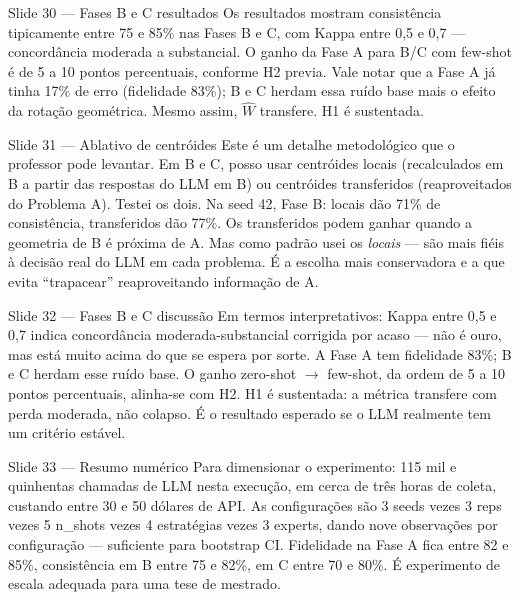 \documentclass[aspectratio=169,10pt]{beamer}
\begin{document}
\begin{frame}{Slide 30 --- Fases B e C resultados}
\footnotesize
Os resultados mostram consist\^encia tipicamente entre 75 e 85\% nas Fases B e C, com Kappa entre 0{,}5 e 0{,}7 --- concord\^ancia moderada a substancial. O ganho da Fase A para B/C com few-shot \'e de 5 a 10 pontos percentuais, conforme H2 previa. Vale notar que a Fase A j\'a tinha 17\% de erro (fidelidade 83\%); B e C herdam essa ru\'ido base mais o efeito da rota\c{c}\~ao geom\'etrica. Mesmo assim, $\hat W$ transfere. H1 \'e sustentada.
\end{frame}

\begin{frame}{Slide 31 --- Ablativo de centr\'oides}
\footnotesize
Este \'e um detalhe metodol\'ogico que o professor pode levantar. Em B e C, posso usar centr\'oides locais (recalculados em B a partir das respostas do LLM em B) ou centr\'oides transferidos (reaproveitados do Problema A). Testei os dois. Na seed 42, Fase B: locais d\~ao 71\% de consist\^encia, transferidos d\~ao 77\%. Os transferidos podem ganhar quando a geometria de B \'e pr\'oxima de A. Mas como padr\~ao usei os \emph{locais} --- s\~ao mais fi\'eis \`a decis\~ao real do LLM em cada problema. \'E a escolha mais conservadora e a que evita ``trapacear'' reaproveitando informa\c{c}\~ao de A.
\end{frame}

\begin{frame}{Slide 32 --- Fases B e C discuss\~ao}
\footnotesize
Em termos interpretativos: Kappa entre 0{,}5 e 0{,}7 indica concord\^ancia moderada-substancial corrigida por acaso --- n\~ao \'e ouro, mas est\'a muito acima do que se espera por sorte. A Fase A tem fidelidade 83\%; B e C herdam esse ru\'ido base. O ganho zero-shot $\to$ few-shot, da ordem de 5 a 10 pontos percentuais, alinha-se com H2. H1 \'e sustentada: a m\'etrica transfere com perda moderada, n\~ao colapso. \'E o resultado esperado se o LLM realmente tem um crit\'erio est\'avel.
\end{frame}

\begin{frame}{Slide 33 --- Resumo num\'erico}
\footnotesize
Para dimensionar o experimento: 115 mil e quinhentas chamadas de LLM nesta execu\c{c}\~ao, em cerca de tr\^es horas de coleta, custando entre 30 e 50 d\'olares de API. As configura\c{c}\~oes s\~ao 3 seeds vezes 3 reps vezes 5 n\_shots vezes 4 estrat\'egias vezes 3 experts, dando nove observa\c{c}\~oes por configura\c{c}\~ao --- suficiente para bootstrap CI. Fidelidade na Fase A fica entre 82 e 85\%, consist\^encia em B entre 75 e 82\%, em C entre 70 e 80\%. \'E experimento de escala adequada para uma tese de mestrado.
\end{frame}
\end{document}
